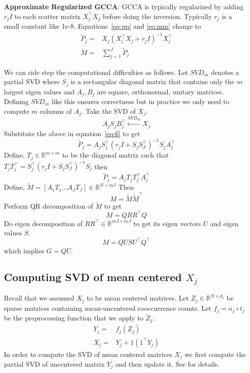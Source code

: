 \documentclass[11pt]{article}
\begin{document}
\noindent\textbf{Approximate Regularized GCCA}: GCCA is typically regularized by adding $r_jI$ to each
scatter matrix $X_j^\top X_j$ before doing the inversion. Typically
$r_j$ is a small constant like 1e-8. Equations~\ref{eq:pp}
and \ref{eq:mm} change to
\begin{align}
  \widetilde{P}_{j} =& X_j(X_j^\top X_j+r_jI)^{-1}X_j^\top \label{eq:6}\\
  M =& \sum_{j=1}^J \widetilde{P}_{j} \label{eq:mmm}
\end{align}

We can side step the computational difficulties as follows.
Let $SVD_m$ denotes a partial SVD where $S_j$ is a rectangular diagonal
matrix that contains only the $m$ largest eigen values and $A_j, B_j$
are square, orthonormal, unitary matrices. Defining $SVD_m$ like this
ensures correctness but in practice we only need to compute $m$
columns of $A_j$. Take the SVD of $X_j$.
$$A_{j} S_{j} B^\top_{j} \xleftarrow{SVD_{m}} X_j$$
 Substitute the above in equation~\ref{eq:6} to get 
$$\widetilde{P}_j = A_j S_j^\top(r_j I + S_j S_J^\top)^{-1}S_j A_j^\top$$ 
Define, $T_j \in \mathbb{R}^{m \times m}$ to be the diagonal matrix such that
$T_jT_j^\top = S_j^\top(r_j I + S_j S_J^\top)^{-1}S_j $ then
$$\widetilde{P}_j = A_j T_j T_j^\top A_j^\top$$
Define, $\tilde{M} = \left[ A_1T_1 \ldots A_JT_J \right] \in \mathbb{R}^{N
  \times mJ}$
Then 
$$M = \tilde{M} \tilde{M}^\top$$
Perform QR decomposition of $\tilde{M}$ to get
$$M = Q R R^\top Q$$
Do eigen decomposition of $R R^\top \in \mathbb{R}^{mJ \times mJ}$
to get its eigen vectors $U$ and eigen values $S$.
$$M = Q U S U^\top Q^\top$$
 which implies $G = QU$. 

\subsection{Computing SVD of mean centered $X_j$}
\label{ssec:svdmc}
Recall that we assumed $X_j$ to be mean centered matrices. Let $Z_j
\in \mathbb{R}^{N \times d_j}$ be sparse matrices containing
mean-uncentered cooccurrence counts. Let $f_j = n_j \circ t_j $ be the preprocessing
function that we apply to $Z_j$. 
\begin{align}
  Y_j =& f_j (Z_j) \\
  X_j =& Y_j + 1 (1^\top Y_j)
\end{align}
In order to compute the SVD of mean centered matrices $X_j$ we first
compute the partial SVD of uncentered 
matrix $Y_j$ and then update it. See \cite{brand2006fast} for details.
\end{document}
